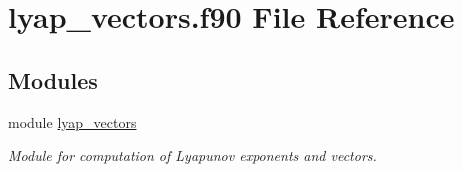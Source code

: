 \hypertarget{lyap__vectors_8f90}{}\section{lyap\+\_\+vectors.\+f90 File Reference}
\label{lyap__vectors_8f90}
\subsection*{Modules}
\begin{DoxyCompactItemize}
\item 
module \hyperlink{namespacelyap__vectors}{lyap\+\_\+vectors}
\begin{DoxyCompactList}\small\item\em Module for computation of Lyapunov exponents and vectors. \end{DoxyCompactList}\end{DoxyCompactItemize}
